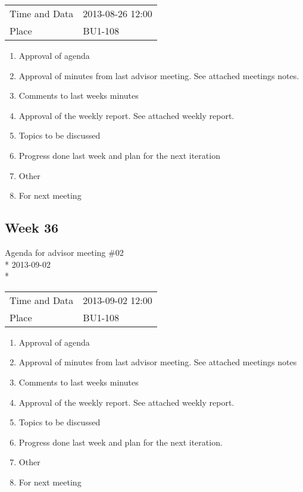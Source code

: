 \begin{table}[H]
\begin{center}
\begin{tabular}{ l | l }
Time and Data & 2013-08-26 12:00 \\
Place & BU1-108 \\
\end{tabular}
\end{center}
\end{table}

\begin{enumerate}[1.]
\item Approval of agenda
\item Approval of minutes from last advisor meeting. See attached meetings notes.
\item Comments to last weeks minutes
\item Approval of the weekly report. See attached weekly report.
\item Topics to be discussed
\item Progress done last week and plan for the next iteration
\item Other
\item For next meeting
\end{enumerate}

\newpage
\subsection{Week 36}

\begin{center}
Agenda for advisor meeting \#02\\*
2013-09-02\\*
\end{center}

\begin{table}[H]
\begin{center}
\begin{tabular}{ l | l }
Time and Data & 2013-09-02 12:00 \\
Place & BU1-108 \\
\end{tabular}
\end{center}
\end{table}


\begin{enumerate}[1.]
\item Approval of agenda
\item Approval of minutes from last advisor meeting. See attached meetings notes
\item Comments to last weeks minutes
\item Approval of the weekly report. See attached weekly report.
\item Topics to be discussed
\item Progress done last week and plan for the next iteration.
\item Other
\item For next meeting
\end{enumerate}

